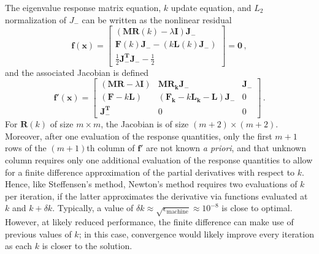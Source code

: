 The eigenvalue response matrix equation, $k$ update equation, 
and $L_2$ normalization of $J_{-}$ can be written as the nonlinear 
residual
    \begin{equation}
    \mathbf{f(x)} = \left [\begin{array}{c}
            (\mathbf{M}\mathbf{R}(k)-\lambda \mathbf{I}) \mathbf{J_-} \\
            \mathbf{F}(k)\mathbf{J_-} - (k\mathbf{L}(k)\mathbf{J_-} ) \\
            \frac{1}{2} \mathbf{J^T_-} \mathbf{J_-} - \frac{1}{2}  
          \end{array} 
    \right ]  = \mathbf{0} \, ,
    \label{eq:residual}
    \end{equation}
and the associated  Jacobian is defined
  \begin{equation}
  \mathbf{f'(x)} = \left [\begin{array}{ccc}
          (\mathbf{M}\mathbf{R}-\lambda \mathbf{I})  
          &  \mathbf{M}\mathbf{R_k}\mathbf{J_-}                     
          & \mathbf{J_-}  \\
          (\mathbf{F}-k\mathbf{L})                   
          &  (\mathbf{F_k}-k\mathbf{L_k}-\mathbf{L}) \mathbf{J_-}   
          & 0  \\
          \mathbf{J^T_-}                             
          & 0                                                       
          & 0
        \end{array} 
  \right ]  \, .
  \label{eq:jacobian}
  \end{equation}
For $\mathbf{R}(k)$ of size $m\times m$, the Jacobian is of 
size $(m+2)\times(m+2)$.  Moreover, after one evaluation of 
the response quantities, only the first $m+1$ rows of the $(m+1)$th 
column of $\mathbf{f'}$ are not known {\it a priori}, and that 
unknown column requires only one additional evaluation of the 
response quantities to allow for a finite difference 
approximation of the partial derivatives with respect to $k$.
Hence, like Steffensen's method, Newton's method requires two 
evaluations of $k$ per iteration, if the latter approximates the 
derivative via functions evaluated at $k$ and $k + \delta k$.  
Typically, a value of 
$\delta k \approx \sqrt{\epsilon_{\text{machine}}} \approx 10^{-8}$
is close to optimal.  However, at likely reduced performance, the 
finite difference can make use of previous values of $k$;  in this 
case, convergence would likely improve every iteration as each $k$ 
is closer to the solution.  

